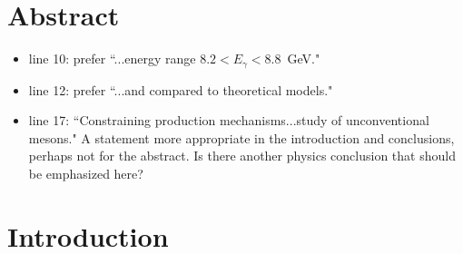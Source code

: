 \documentclass{article}
\begin{document}
\section{Abstract}

\begin{itemize}
\item line 10: prefer ``...energy range $8.2 < E_\gamma < 8.8$~GeV."
\item line 12: prefer ``...and compared to theoretical  models."
\item line 17: ``Constraining production mechanisms...study of unconventional mesons." A statement more appropriate in the introduction and conclusions, perhaps not for the abstract. Is there another physics conclusion that should be emphasized here?
\end{itemize}

\section{Introduction}
\end{document}
